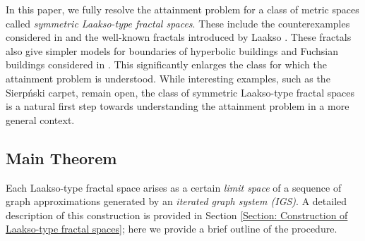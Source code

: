 \documentclass{amsart}
\numberwithin{equation}{section}
\theoremstyle{definition}
\theoremstyle{remark}
\begin{document}
In this paper, we fully resolve the attainment problem for a class of metric spaces called \emph{symmetric Laakso-type fractal spaces}. These include the counterexamples considered in \cite{anttila2024constructions} and the well-known fractals introduced by Laakso \cite{La00, LangPlaut,Laakso}. These fractals also give simpler models for boundaries of hyperbolic buildings and Fuchsian buildings considered in \cite{BourdonPI}. This significantly enlarges the class for which the attainment problem is understood. While interesting examples, such as the Sierp\'nski carpet, remain open, the class of symmetric Laakso-type fractal spaces is a natural first step towards understanding the attainment problem in a more general context.




\subsection{Main Theorem} 
Each Laakso-type fractal space arises as a certain \emph{limit space} of a sequence of graph approximations generated by an \emph{iterated graph system (IGS)}. A detailed description of this construction is provided in Section \ref{Section: Construction of Laakso-type fractal spaces}; here we provide a brief outline of the procedure.
\end{document}
